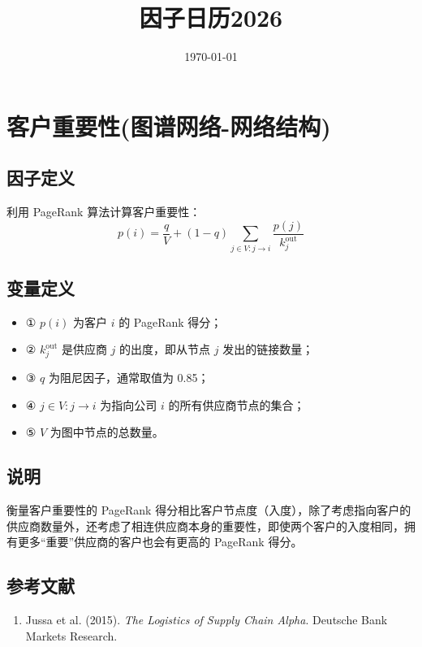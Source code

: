 \documentclass{article}
\title{因子日历2026}
\date{\today}
\begin{document}
\maketitle

\section{客户重要性(图谱网络-网络结构)}

\subsection{因子定义}
利用 PageRank 算法计算客户重要性：
\begin{equation}
    p(i) = \frac{q}{V} + (1 - q) \sum_{j \in V: j \to i} \frac{p(j)}{k_j^{\mathrm{out}}}
\end{equation}

\subsection{变量定义}
\begin{itemize}
    \item ① \( p(i) \) 为客户 \( i \) 的 PageRank 得分；
    \item ② \( k_j^{\mathrm{out}} \) 是供应商 \( j \) 的出度，即从节点 \( j \) 发出的链接数量；
    \item ③ \( q \) 为阻尼因子，通常取值为 0.85；
    \item ④ \( j \in V: j \to i \) 为指向公司 \( i \) 的所有供应商节点的集合；
    \item ⑤ \( V \) 为图中节点的总数量。
\end{itemize}

\subsection{说明}
衡量客户重要性的 PageRank 得分相比客户节点度（入度），除了考虑指向客户的供应商数量外，还考虑了相连供应商本身的重要性，即使两个客户的入度相同，拥有更多“重要”供应商的客户也会有更高的 PageRank 得分。

\subsection{参考文献}
\begin{enumerate}
    \item Jussa et al. (2015). \textit{The Logistics of Supply Chain Alpha}. Deutsche Bank Markets Research.
\end{enumerate}
\end{document}
